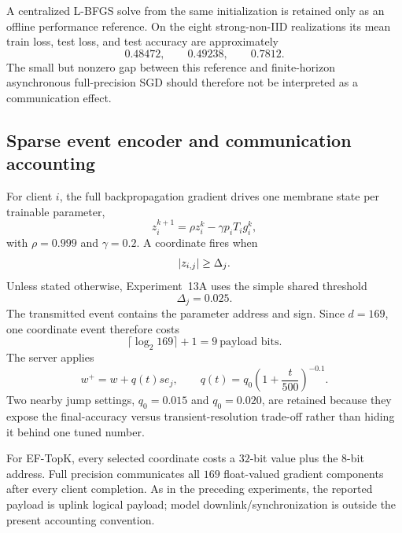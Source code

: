 A centralized L-BFGS solve from the same initialization is retained only as an offline performance reference. On the eight strong-non-IID realizations its mean train loss, test loss, and test accuracy are approximately
\begin{equation}
  0.48472,\qquad 0.49238,\qquad 0.7812.
\end{equation}
The small but nonzero gap between this reference and finite-horizon asynchronous full-precision SGD should therefore not be interpreted as a communication effect.

\subsection{Sparse event encoder and communication accounting}

For client $i$, the full backpropagation gradient drives one membrane state per trainable parameter,
\begin{equation}
  z_i^{k+1}=\rho z_i^k-\gamma p_iT_i g_i^k,
\end{equation}
with $\rho=0.999$ and $\gamma=0.2$. A coordinate fires when
\begin{equation}
  \left|z_{i,j}\right|\geq\Delta_j.
\end{equation}
Unless stated otherwise, Experiment~13A uses the simple shared threshold
\begin{equation}
  \Delta_j=0.025.
\end{equation}
The transmitted event contains the parameter address and sign. Since $d=169$, one coordinate event therefore costs
\begin{equation}
  \lceil\log_2 169\rceil+1=9\ \text{payload bits}.
\end{equation}
The server applies
\begin{equation}
  w^+=w+q(t)s e_j,
  \qquad
  q(t)=q_0\left(1+\frac{t}{500}\right)^{-0.1}.
\end{equation}
Two nearby jump settings, $q_0=0.015$ and $q_0=0.020$, are retained because they expose the final-accuracy versus transient-resolution trade-off rather than hiding it behind one tuned number.

For EF-TopK, every selected coordinate costs a $32$-bit value plus the $8$-bit address. Full precision communicates all $169$ float-valued gradient components after every client completion. As in the preceding experiments, the reported payload is uplink logical payload; model downlink/synchronization is outside the present accounting convention.

